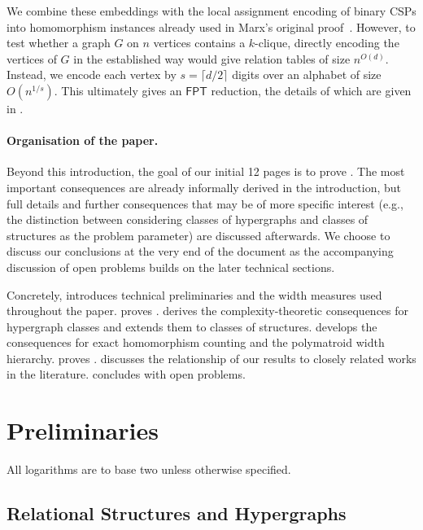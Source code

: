 \documentclass[11pt,letterpaper]{article}
\theoremstyle{definition}
\theoremstyle{remark}
\newcommand{\FPT}{\ensuremath{\mathsf{FPT}}}
\providecommand{\FPT}{\ensuremath{\mathsf{FPT}}}
\begin{document}
We combine these embeddings with the local assignment encoding of binary CSPs into homomorphism instances already used in Marx's original proof~\cite{Marx13}. However, to test whether a graph $G$ on $n$ vertices contains a $k$-clique, directly encoding the vertices of $G$ in the established way would give relation tables of size $n^{O(d)}$. Instead, we encode each vertex by $s=\lceil d/2\rceil$ digits over an alphabet of size $O(n^{1/s})$. This ultimately gives an \FPT{} reduction, the details of which are given in .





\paragraph{Organisation of the paper.}
Beyond this introduction, the goal of our initial 12 pages is to prove . The most important consequences are already informally derived in the introduction, but full details and further consequences that may be of more specific interest (e.g., the distinction between considering classes of hypergraphs and classes of structures as the problem parameter) are discussed afterwards. We choose to discuss our conclusions at the very end of the document as the accompanying discussion of open problems builds on the later technical sections.

Concretely,  introduces technical preliminaries and the width measures used throughout the paper.
 proves .
 derives the complexity-theoretic consequences for hypergraph classes and extends them to classes of structures.
 develops the consequences for exact homomorphism counting and the polymatroid width hierarchy.
 proves .
 discusses the relationship of our results to closely related works in the literature.
 concludes with open problems.
\section{Preliminaries}
\label{sec:preliminaries}
All logarithms are to base two unless otherwise specified.

\subsection{Relational Structures and Hypergraphs}
\end{document}
